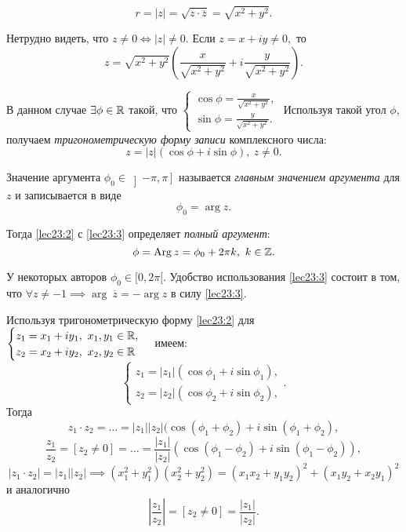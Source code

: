 \documentclass[../../main.tex]{subfiles}
\begin{document}
	\[r = |z| = \sqrt{z\cdot \overline{z}} = \sqrt{x^2+y^2}.\]
	
	Нетрудно видеть, что $z \neq 0 \iff |z| \neq 0.$ Если
	 $z = x+iy \neq 0,$ то \[z = \sqrt{x^2+y^2}\left(\frac{x}{\sqrt{x^2+y^2}}
	 + i\frac{y}{\sqrt{x^2+y^2}}\right). \] 
	
	В данном случае $\exists \phi\in\mathbb{R}$ такой, что 
	$\begin{cases} 
	\cos \phi = \frac{x}{\sqrt{x^2+y^2}},\\
	\sin \phi = \frac{y}{\sqrt{x^2+y^2}}.
	\end{cases}$ Используя такой угол $\phi$, получаем
	\emph{тригонометрическую форму записи} комплексного числа:
	\begin{equation}\label{lec23:2}
	z = |z|(\cos \phi + i \sin\phi),\ z\neq 0.
	\end{equation} 
	
	Значение аргумента ${\phi}_0 \in \left]-\pi, \pi\right]$ называется 
	\emph{главным
	значением аргумента} для $z$ и записывается в виде
	\begin{equation}
	\label{lec23:3}
	{\phi}_0 = \arg z.
	\end{equation}
	
	Тогда \eqref{lec23:2} с \eqref{lec23:3} определяет \emph{полный аргумент}:
	\[ \phi = \operatorname{Arg} z = {\phi}_0+2\pi k,\ k\in\mathbb{Z}. \]
	
	У некоторых авторов ${\phi}_0\in[0, 2\pi[.$ Удобство использования
	\eqref{lec23:3} состоит в том, что $\forall z \neq -1 \implies \arg\
	\overline{z} = - \arg z$ в силу  \eqref{lec23:3}.
	
	Используя тригонометрическую форму  \eqref{lec23:2} для  
	$\begin{cases} 
	z_1 =  x_1+iy_1,\ x_1, y_1\in \mathbb{R},\\
	z_2 =  x_2+iy_2,\ x_2, y_2\in \mathbb{R}
	\end{cases}$ имеем:
	\[\begin{cases} 
	z_1 = |z_1|(\cos {\phi}_1 + i\sin {\phi}_1),\\
	z_2 =  |z_2|(\cos {\phi}_2 + i\sin {\phi}_2),
	\end{cases}.\] Тогда
	\[z_1\cdot z_2 = \ldots = |z_1| |z_2|(\cos({\phi}_1+{\phi}_2)+
	i\sin({\phi}_1+{\phi}_2),\]
	\[\frac{z_1}{z_2} =[z_2 \neq 0] = \ldots =\frac{ |z_1|}{ |z_2|}
	(\cos({\phi}_1-{\phi}_2)+i\sin({\phi}_1-{\phi}_2)),\]
	\[ |z_1\cdot z_2| = |z_1||z_2| \implies (x_1^2+y_1^2)(x_2^2+y_2^2)
	 = (x_1x_2 + y_1y_2)^2 + (x_1y_2+x_2y_1)^2 \]
	и аналогично \[\left|\frac{z_1}{z_2}\right| = [z_2 \neq 0] = 
	\frac{|z_1|}{|z_2|}.\]
	
\end{document}
